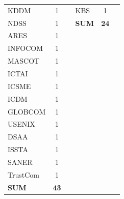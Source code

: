 \begin{table}[h]
\begin{tabular}{lcclcc}
KDDM             & 1          &      \cite{nguyen2020deep}      & KBS  &  1 &   \cite{zhuang2022just}   \\
NDSS             & 1          &       \cite{li2018vuldeepecker}     &  \textbf{SUM}   & \textbf{24}  &       \\
ARES             & 1          &       \cite{kronjee2018discovering}     &     &   &      \\
INFOCOM          & 1          &     \cite{ziems2021security}       &       &   &       \\
MASCOT               & 1          &    \cite{filus2020random}          &   &  &       \\
ICTAI            & 1          &      \cite{phan2017convolutional}      &    &   &            \\
ICSME            & 1          &      \cite{sabetta2018practical}      &      &       &            \\
ICDM             & 1          &       \cite{8594942}     &    &            &    \\
GLOBCOM          & 1          &      \cite{Vuldiggerpaper}      &          &       &            \\
USENIX           & 1          &     \cite{yamaguchi2011vulnerability}    &  &           &             \\
DSAA             & 1          &     \cite{nguyen2022mando}    &  &           &             \\
ISSTA            & 1          &     \cite{cheng2022path}    &  &           &             \\
SANER            & 1          &     \cite{ding2022velvet}    &  &           &             \\
TrustCom         & 1          &     \cite{yang2022source}    &  &           &             \\
\textbf{SUM} & \textbf{43} & & & &  \\
\bottomrule
\end{tabular}
\label{tbl:venueDist}
\end{table}
